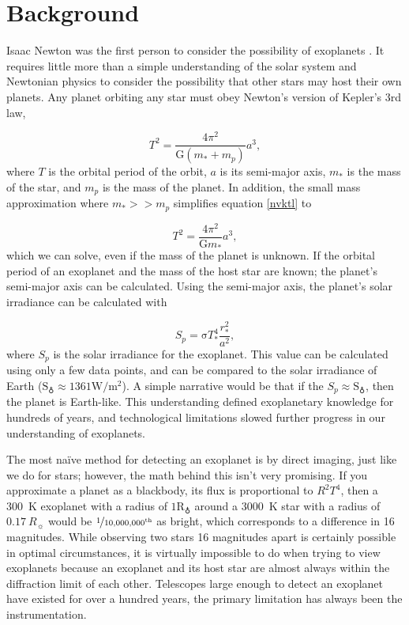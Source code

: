 \chapter{Background}
\label{background}
Isaac Newton was the first person to consider the possibility of exoplanets
 \citep{principia}. It requires little more than a simple understanding of the
 solar system and Newtonian physics to consider the possibility that other stars
 may host their own planets. Any planet orbiting any star must obey Newton's
 version of Kepler's 3rd law,

\begin{equation}
    T^2=\frac{4\pi^2}{\mathrm{G}\left(m_{*}+m_{p}\right)}a^3,
    \label{nvktl}
\end{equation}
where $T$ is the orbital period of the orbit, $a$ is its semi-major axis, $m_*$ is
 the mass of the star, and $m_p$ is the mass of the planet. In addition, the
 small mass approximation where $m_*>>m_p$ simplifies equation \ref{nvktl} to

\begin{equation}
    T^2=\frac{4\pi^2}{\mathrm{G}m_{*}}a^3,
\end{equation}
which we can solve, even if the mass of the planet is unknown. If the orbital
 period of an exoplanet and the mass of the host star are known; the planet's
 semi-major axis can be calculated. Using the semi-major axis, the planet's
 solar irradiance can be calculated with

\begin{equation}
    S_p=\mathrm{\sigma} T_{*}^{4}\frac{r_{*}^2}{a^2},
\end{equation}
where $S_p$ is the solar irradiance for the exoplanet. This value can be
 calculated using only a few data points, and can be compared to the solar
 irradiance of Earth
 ($\mathrm{S}_{\earth}\approx1361 \si{\watt\per\meter\squared}$). A simple
 narrative would be that if the $S_{p}\approx \mathrm{S}_{\earth}$, then the
 planet is Earth-like. This understanding defined exoplanetary knowledge for
 hundreds of years, and technological limitations slowed further progress in
 our understanding of exoplanets.

The most na\"{i}ve method for detecting an exoplanet is by direct imaging, just
 like we do for stars; however, the math behind this isn't very
 promising. If you approximate a planet as a blackbody, its flux is proportional
 to $R^{2}T^{4}$, then a \SI{300}{\kelvin} exoplanet with a radius of
 $1\mathrm{R}_{\earth}$ around a \SI{3000}{\kelvin} star with a radius of
 $0.17\ R_{\sun}$ would be $\nicefrac{1}{10,000,000^\mathrm{th}}$ as bright,
 which corresponds to a difference in 16 magnitudes. While observing two stars
 16 magnitudes apart is certainly possible in optimal circumstances, it is
 virtually impossible to do when trying to view exoplanets because an exoplanet
 and its host star are almost always within the diffraction limit of each other.
 Telescopes large enough to detect an exoplanet have existed for over a hundred
 years, the primary limitation has always been the instrumentation.

